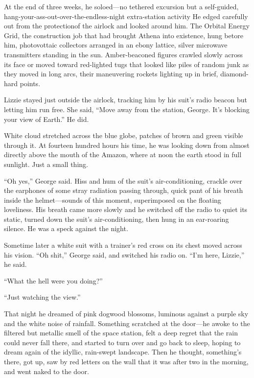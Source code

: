 At the end of three weeks, he soloed—no tethered excursion but a self-guided, hang-your-ass-out-over-the-endless-night extra-station activity He edged carefully out from the protectionof the airlock and looked around him. The Orbital Energy Grid, the construction job that had brought Athena into existence, hung betore him, photovottaic collectors arranged in an ebony lattice, silver microwave transmitters standing in the sun. Amber-beaconed figures crawled slowly across its face or moved toward red-lighted tugs that looked like piles of random junk as they moved in long arcs, their maneuvering rockets lighting up in brief, diamond-hard points.

Lizzie stayed just outside the airlock, tracking him by his suit’s radio beacon but letting him run free. She said, “Move away from the station, George. It’s blocking your view of Earth.” He did.

White cloud stretched across the blue globe, patches of brown and green visible through it. At fourteen hundred hours his time, he was looking down from almost directly above the mouth of the Amazon, where at noon the earth stood in full sunlight. Just a small thing.

“Oh yes,” George said. Hiss and hum of the suit’s air-conditioning, crackle over the earphones of some stray radiation passing through, quick pant of his breath inside the helmet—sounds of this moment, superimposed on the floating loveliness. His breath came more slowly and he switched off the radio to quiet its static, turned down the suit’s air-conditioning, then hung in an ear-roaring silence. He was a speck against the night.

Sometime later a white suit with a trainer’s red cross on its chest moved across his vision. “Oh shit,” George said, and switched his radio on. “I’m here, Lizzie,” he said.

“What the hell were you doing?”

“Just watching the view.”

That night he dreamed of pink dogwood blossoms, luminous against a purple sky and the white noise of rainfall. Something scratched at the door—he awoke to the filtered but metallic smell of the space station, felt a deep regret that the rain could never fall there, and started to turn over and go back to sleep, hoping to dream again of the idyllic, rain-swept landscape. Then he thought, something’s there, got up, saw by red letters on the wall that it was after two in the morning, and went naked to the door.


